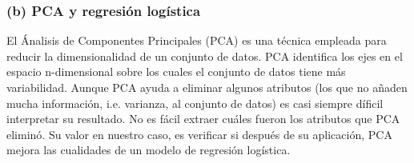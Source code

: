 \documentclass[letterpaper,11pt]{article}
\newenvironment{Table}
  {\par\medskip\noindent\minipage{\linewidth}}
  {\endminipage\par\medskip}
\begin{document}
\begin{multicols}{2}
\begin{Table}
\begin{center}
\label{tab:fs}
\end{center}
\end{Table}


\subsubsection*{(b) PCA y regresión logística}
El Ánalisis de Componentes Principales (PCA) es una técnica empleada para reducir la dimensionalidad de un conjunto de
datos. PCA identifica los ejes en el espacio n-dimensional sobre los cuales el conjunto de datos tiene más variabilidad.
Aunque PCA ayuda a eliminar algunos atributos (los que no añaden mucha información, i.e. varianza, al conjunto de datos)
es casi siempre díficil interpretar su resultado. No es fácil extraer cuáles fueron los atributos que PCA eliminó. 
Su valor en nuestro caso, es verificar si después de su aplicación, PCA mejora las cualidades de un modelo de regresión
logística.


\end{multicols}
\end{document}
